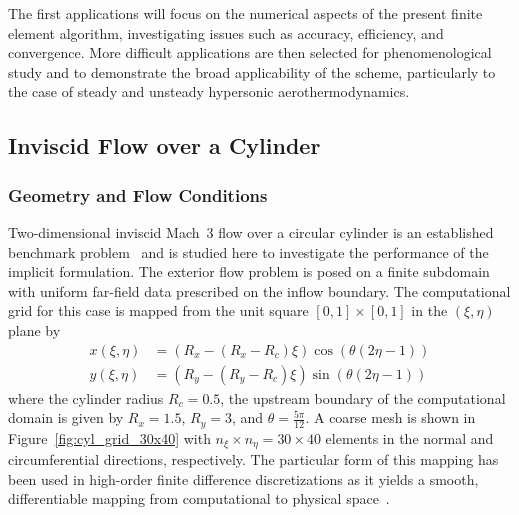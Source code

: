 The first applications will focus on the numerical aspects of the present finite element algorithm, investigating issues such as accuracy, efficiency, and convergence.  More difficult applications are then selected for phenomenological study and to demonstrate the broad applicability of the scheme, particularly to the case of steady and unsteady hypersonic aerothermodynamics.

\clearpage
\subsection{Inviscid Flow over a Cylinder\label{sec:comp_ns_cyl}}
\subsubsection{Geometry and Flow Conditions}
Two-dimensional inviscid Mach~3 flow over a circular cylinder is an established benchmark problem~\cite{jang_shu_weno_JCP,shu_fd_fv_dg_icase} and is studied here to investigate the performance of the implicit formulation.  The exterior flow problem is posed on a finite subdomain with uniform far-field data prescribed on the inflow boundary.  The computational grid for this case is mapped from the unit square $\left[0,1\right]\times\left[0,1\right]$ in the $\left(\xi,\eta\right)$ plane by
\begin{align}
  x(\xi,\eta) &= \left(R_x - \left(R_x - R_c\right)\xi\right) \cos\left(\theta\left(2\eta - 1\right)\right) \\
  y(\xi,\eta) &= \left(R_y - \left(R_y - R_c\right)\xi\right) \sin\left(\theta\left(2\eta - 1\right)\right) 
\end{align}
where the cylinder radius $R_c=0.5$, the upstream boundary of the computational domain is given by $R_x=1.5$, $R_y=3$, and $\theta=\frac{5\pi}{12}$.  A coarse mesh is shown in Figure~\ref{fig:cyl_grid_30x40} with $n_\xi\times n_\eta=30\times 40$ elements in the normal and circumferential directions, respectively.  The particular form of this mapping has been used in high-order finite difference discretizations as it yields a smooth, differentiable  mapping from computational to physical space~\cite{shu_fd_fv_dg_icase}.
